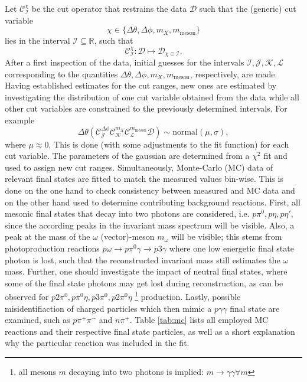 Let $\mathcal{C}^\chi_{\mathcal{I}}$ be the cut operator that restrains the data $\mathcal{D}$ such that the (generic) cut variable $$\chi\in\{\Delta\theta,\Delta\phi,m_X,m_\text{meson}\}$$ lies in the interval $\mathcal{I}\subseteq\mathbb{R}$, such that 
\begin{equation}
	\mathcal{C}_{\mathcal{I}}^\chi:\mathcal{D}\mapsto\mathcal{D}_{\chi\in\mathcal{I}} .
\end{equation}
	 After a first inspection of the data, initial guesses for the intervals $\mathcal{I},\mathcal{J},\mathcal{K},\mathcal{L}$ corresponding to the quantities $\Delta\theta,\Delta\phi,m_X,m_\text{meson}$, respectively, are made.
	Having established estimates for the cut ranges, new ones are estimated by investigating the distribution of one cut variable obtained from the data while all other cut variables are constrained to the previously determined intervals. For example 
	$$\Delta\theta\left(\mathcal{C}_\mathcal{J}^{\Delta\phi}\mathcal{C}_\mathcal{K}^{m_X}\mathcal{C}_\mathcal{L}^{m_\text{meson}}\mathcal{D}\right)\sim \text{normal}(\mu,\sigma),$$
	where $\mu\approx0$. This is done (with some adjustments to the fit function) for each cut variable. The parameters of the gaussian are determined from a $\chi^2$ fit and used to assign new cut ranges. Simultaneously, Monte-Carlo (MC) data of relevant final states are fitted to match the measured values bin-wise. This is done on the one hand to check consistency between measured and MC data and on the other hand used to determine contributing background reactions. First, all mesonic final states that decay into two photons are considered, i.e. $p\pi^0,p\eta,p\eta'$, since the according peaks in the invariant mass spectrum will be visible. Also, a peak at the mass of the $\omega$ (vector)-meson $m_\omega$ will be visible; this stems from photoproduction reactions $p\omega\to p\pi^0\gamma\to p3\gamma$ where one low energetic final state photon is lost, such that the reconstructed invariant mass still estimates the $\omega$ mass. Further, one should investigate the impact of neutral final states, where some of the final state photons may get lost during reconstruction, as can be observed for $p2\pi^0,p\pi^0\eta,p3\pi^0,p2\pi^0\eta$ \footnote{all mesons $m$ decaying into two photons is implied: $m\to\gamma\gamma \forall m$} production. Lastly, possible misidentifiaction of charged particles which then mimic a $p\gamma\gamma$ final state are examined, such as $p\pi^+\pi^-$ and $n\pi^+$. Table \ref{tab:mc} lists all employed MC reactions and their respective final state particles, as well as a short explanation why the particular reaction was included in the fit.
	
